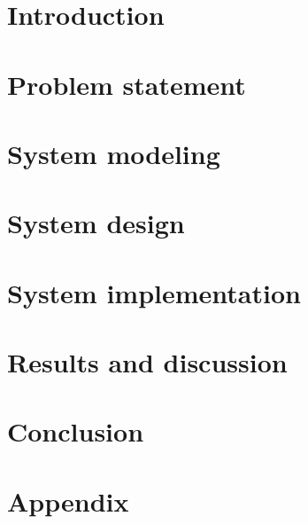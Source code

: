 \documentclass[11pt,a4paper,fleqn]{article}
\begin{document}

\newpage

\tableofcontents
\newpage


\section{Introduction}%
\label{sec:introduction}


\section{Problem statement}%
\label{sec:problem_statement}


\section{System modeling}%
\label{sec:system_modeling}


\section{System design}%
\label{sec:system_design}


\section{System implementation}%
\label{sec:system_implementation}


\section{Results and discussion}%
\label{sec:result_and_discussion}


\section{Conclusion}%
\label{sec:conclusion}



{}


\section{Appendix}%
\label{sec:appendix}

\end{document}
